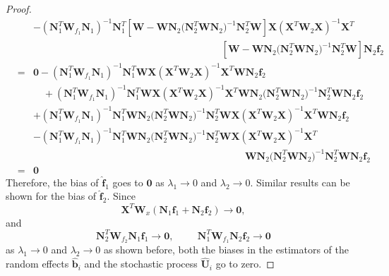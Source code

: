 \documentclass[article,lineno]{biometrika}
\begin{document}
\begin{proof}
\begin{eqnarray*}
&& 
- (\boldsymbol N_1^T \boldsymbol W_{f_1}  \boldsymbol N_1)^{-1}  \boldsymbol N_1^T 
\left[ \boldsymbol W 
 -
\boldsymbol W \boldsymbol N_2 
 (\boldsymbol N_2^T  \boldsymbol W \boldsymbol N_2 \boldsymbol)^{-1} 
 \boldsymbol N_2^T  \boldsymbol W\right]
\boldsymbol X(\boldsymbol X^T  \boldsymbol W_2\boldsymbol X)^{-1}  \boldsymbol X^T  \\
&& \hspace{8cm}
\left[ \boldsymbol W 
 -
\boldsymbol W \boldsymbol N_2 
 (\boldsymbol N_2^T  \boldsymbol W \boldsymbol N_2 \boldsymbol)^{-1} 
 \boldsymbol N_2^T  \boldsymbol W\right]
\boldsymbol N_2 \boldsymbol f_2 \\
&=& 
\bm 0 
- (\boldsymbol N_1^T \boldsymbol W_{f_1}  \boldsymbol N_1)^{-1}  \boldsymbol N_1^T 
\boldsymbol W
\boldsymbol X(\boldsymbol X^T  \boldsymbol W_2\boldsymbol X)^{-1}  \boldsymbol X^T
\boldsymbol W \boldsymbol N_2 \boldsymbol f_2 \\
&& \quad
+ (\boldsymbol N_1^T \boldsymbol W_{f_1}  \boldsymbol N_1)^{-1}  \boldsymbol N_1^T 
 \boldsymbol W
\boldsymbol X(\boldsymbol X^T  \boldsymbol W_2\boldsymbol X)^{-1}  \boldsymbol X^T
\boldsymbol W \boldsymbol N_2 
 (\boldsymbol N_2^T  \boldsymbol W \boldsymbol N_2 \boldsymbol)^{-1} 
 \boldsymbol N_2^T  \boldsymbol W
\boldsymbol N_2 \boldsymbol f_2 \\
&& 
+ (\boldsymbol N_1^T \boldsymbol W_{f_1}  \boldsymbol N_1)^{-1}  \boldsymbol N_1^T 
\boldsymbol W \boldsymbol N_2 
 (\boldsymbol N_2^T  \boldsymbol W \boldsymbol N_2 \boldsymbol)^{-1} 
 \boldsymbol N_2^T  \boldsymbol W
\boldsymbol X(\boldsymbol X^T  \boldsymbol W_2\boldsymbol X)^{-1}  \boldsymbol X^T 
\boldsymbol W \boldsymbol N_2 \boldsymbol f_2 \\
&& 
- (\boldsymbol N_1^T \boldsymbol W_{f_1}  \boldsymbol N_1)^{-1}  \boldsymbol N_1^T 
\boldsymbol W \boldsymbol N_2 
 (\boldsymbol N_2^T  \boldsymbol W \boldsymbol N_2 \boldsymbol)^{-1} 
 \boldsymbol N_2^T  \boldsymbol W
\boldsymbol X(\boldsymbol X^T  \boldsymbol W_2\boldsymbol X)^{-1}  \boldsymbol X^T  \\
&& \hspace{9cm}
\boldsymbol W \boldsymbol N_2 
 (\boldsymbol N_2^T  \boldsymbol W \boldsymbol N_2 \boldsymbol)^{-1} 
 \boldsymbol N_2^T  \boldsymbol W
\boldsymbol N_2 \boldsymbol f_2\\
&=& \bm 0
\end{eqnarray*}
Therefore, the bias of $\bm {\hat f}_1$ goes to $\bm 0$ as $\lambda_1 \to 0$ and $\lambda_2 \to 0$.
Similar results can be shown for the bias of $\bm {\hat f}_2$.
Since 
$$\boldsymbol X^T  \boldsymbol W_x 
(\boldsymbol N_{1} \boldsymbol f_1 + 
  \boldsymbol N_{2} \boldsymbol f_2) \to \bm 0,
$$
and 
$$
\boldsymbol N_2^T \boldsymbol W_{f_2} \boldsymbol N_{1} \boldsymbol f_1 \to \bm 0,
\hspace{1cm}
\boldsymbol N_1^T \boldsymbol W_{f_1}
\boldsymbol N_2 \boldsymbol f_2 \to \bm 0
$$
as $\lambda_1 \to 0$ and $\lambda_2 \to 0$ as shown before, both the biases in the estimators of the random effects 
$\bm {\hat b}_i$ and the stochastic process $\bm {\hat U}_i$ go to zero. 
\end{proof}
\end{document}
